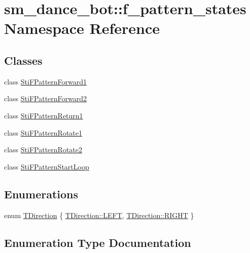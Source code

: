 \hypertarget{namespacesm__dance__bot_1_1f__pattern__states}{}\section{sm\+\_\+dance\+\_\+bot\+:\+:f\+\_\+pattern\+\_\+states Namespace Reference}
\label{namespacesm__dance__bot_1_1f__pattern__states}
\subsection*{Classes}
\begin{DoxyCompactItemize}
\item 
class \hyperlink{structsm__dance__bot_1_1f__pattern__states_1_1StiFPatternForward1}{Sti\+F\+Pattern\+Forward1}
\item 
class \hyperlink{structsm__dance__bot_1_1f__pattern__states_1_1StiFPatternForward2}{Sti\+F\+Pattern\+Forward2}
\item 
class \hyperlink{structsm__dance__bot_1_1f__pattern__states_1_1StiFPatternReturn1}{Sti\+F\+Pattern\+Return1}
\item 
class \hyperlink{structsm__dance__bot_1_1f__pattern__states_1_1StiFPatternRotate1}{Sti\+F\+Pattern\+Rotate1}
\item 
class \hyperlink{structsm__dance__bot_1_1f__pattern__states_1_1StiFPatternRotate2}{Sti\+F\+Pattern\+Rotate2}
\item 
class \hyperlink{structsm__dance__bot_1_1f__pattern__states_1_1StiFPatternStartLoop}{Sti\+F\+Pattern\+Start\+Loop}
\end{DoxyCompactItemize}
\subsection*{Enumerations}
\begin{DoxyCompactItemize}
\item 
enum \hyperlink{namespacesm__dance__bot_1_1f__pattern__states_acc99b72745466e5dcee9272425a34e58}{T\+Direction} \{ \hyperlink{namespacesm__dance__bot_1_1f__pattern__states_acc99b72745466e5dcee9272425a34e58a684d325a7303f52e64011467ff5c5758}{T\+Direction\+::\+L\+E\+FT}, 
\hyperlink{namespacesm__dance__bot_1_1f__pattern__states_acc99b72745466e5dcee9272425a34e58a21507b40c80068eda19865706fdc2403}{T\+Direction\+::\+R\+I\+G\+HT}
 \}
\end{DoxyCompactItemize}


\subsection{Enumeration Type Documentation}
\mbox{\label{namespacesm__dance__bot_1_1f__pattern__states_acc99b72745466e5dcee9272425a34e58}} 
